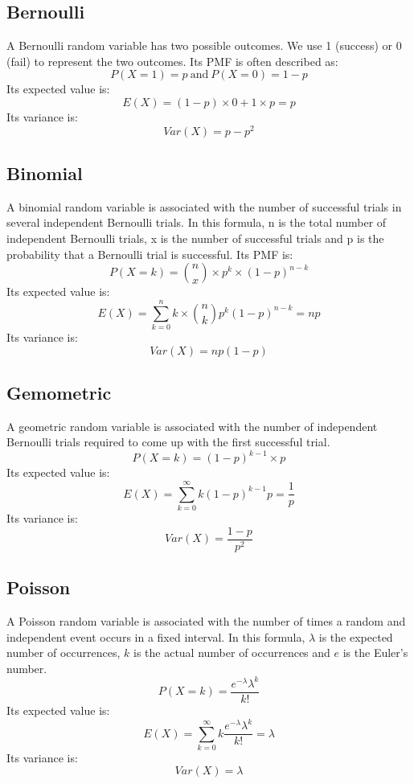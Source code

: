 \documentclass[11pt]{article}
\begin{document}
\subsection{Bernoulli}
A Bernoulli random variable has two possible outcomes. We use 1 (success) or 0 (fail) to represent the two outcomes. 
Its PMF is often described as:
$$P(X = 1) = p \: \text{and} \: P(X = 0) = 1 - p$$
Its expected value is:
$$E(X) = (1-p) \times 0 + 1 \times p = p$$
Its variance is:
$$Var(X) = p - p^2$$

\subsection{Binomial}
A binomial random variable is associated with the number of successful trials in several independent Bernoulli trials.
In this formula, n is the total number of independent Bernoulli trials, x is the number of successful trials and p is the probability that a Bernoulli trial is successful.
Its PMF is:
$$P(X = k) = {n \choose x} \times p^k \times (1-p)^{n-k}$$
Its expected value is:
$$E(X) = \sum_{k=0}^n k \times {n \choose k} p^k (1-p)^{n-k} = np$$
Its variance is:
$$Var(X) = np(1-p)$$

\subsection{Gemometric}
A geometric random variable is associated with the number of independent Bernoulli trials required to come up with the first successful trial. 
$$P(X = k) = (1-p)^{k-1} \times p$$
Its expected value is:
$$E(X) = \sum_{k=0}^{\infty} k(1-p)^{k-1}p = \frac{1}{p}$$
Its variance is:
$$Var(X) = \frac{1-p}{p^2}$$

\subsection{Poisson}
A Poisson random variable is associated with the number of times a random and independent event occurs in a fixed interval.
In this formula, $\lambda$ is the expected number of occurrences, $k$ is the actual number of occurrences and $e$ is the Euler's number.
$$P(X = k) = \frac{e^{-\lambda}\lambda^k}{k!}$$
Its expected value is:
$$E(X) = \sum_{k=0}^{\infty} k\frac{e^{-\lambda}\lambda^k}{k!} = \lambda $$
Its variance is:
$$Var(X) = \lambda$$
\end{document}
